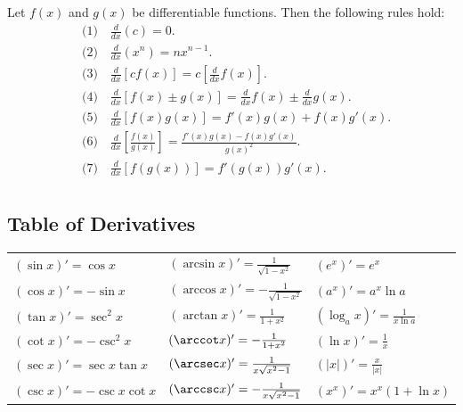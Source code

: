 \documentclass[a4paper,11pt]{article}
\begin{document}
\begin{tcolorbox}
    Let $f(x)$ and $g(x)$ be differentiable functions. Then the following rules hold:
    \[
    \begin{aligned}
        &\text{(1)} \quad \frac{d}{dx}(c) = 0. \\[8pt]  
        &\text{(2)} \quad \frac{d}{dx}(x^n) = nx^{n-1}. \\[8pt]
        &\text{(3)} \quad \frac{d}{dx}[cf(x)] = c[\frac{d}{dx}f(x)]. \\[8pt]
        &\text{(4)} \quad \frac{d}{dx}[f(x) \pm g(x)] = \frac{d}{dx}f(x) \pm \frac{d}{dx}g(x). \\[8pt]
        &\text{(5)} \quad \frac{d}{dx}[f(x)g(x)] = f'(x)g(x) + f(x)g'(x). \\[8pt]
        &\text{(6)} \quad \frac{d}{dx}[\frac{f(x)}{g(x)}] = \frac{f'(x)g(x) - f(x)g'(x)}{g(x)^2}. \\[8pt]
        &\text{(7)} \quad \frac{d}{dx}[f(g(x))] = f'(g(x))g'(x). \\[8pt]
    \end{aligned}
    \]
\end{tcolorbox}




\subsection{Table of Derivatives}

\begin{tcolorbox}
    \begin{tabularx}{\textwidth}{X|X|X}
         $(\sin x)' = \cos x$ & 
         $(\arcsin x)' = \frac{1}{\sqrt{1-x^2}}$ & 
         $(e^x)' = e^x$ \\[10pt]
         
         $(\cos x)' = -\sin x$ & 
         $(\arccos x)' = -\frac{1}{\sqrt{1-x^2}}$ & 
         $(a^x)' = a^x\ln{a}$ \\[10pt]
         
         $(\tan x)' = \sec^2 x$ & 
         $(\arctan x)' = \frac{1}{1+x^2}$ & 
         $(\log_a{x})' = \frac{1}{x\ln{a}}$ \\[10pt]
         
         $(\cot x)' = -\csc^2 x$ & 
         $(\arccot x)' = -\frac{1}{1+x^2}$ & 
         $(\ln{x})' = \frac{1}{x}$ \\[10pt]
         
         $(\sec x)' = \sec x \tan x $ & 
         $(\arcsec x)' = \frac{1}{x\sqrt{x^2-1}}$ & 
         $(\left| x \right|)' = \frac{x}{|x|}$ \\[10pt]
         
         $(\csc x)' = -\csc x \cot x $ & 
         $(\arccsc x)' = -\frac{1}{x\sqrt{x^2-1}}$ & 
         $(x^x)' = x^x(1+\ln{x})$ \\[10pt]
    \end{tabularx}
\end{tcolorbox}
\end{document}
